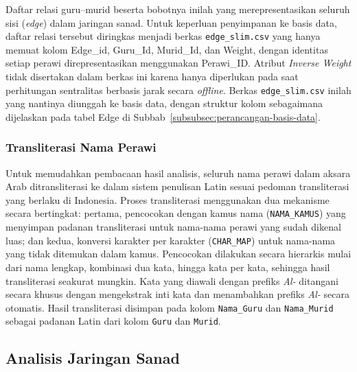 Daftar relasi guru--murid beserta bobotnya inilah yang merepresentasikan seluruh sisi (\textit{edge}) dalam jaringan sanad. Untuk keperluan penyimpanan ke basis data, daftar relasi tersebut diringkas menjadi berkas \texttt{edge\_slim.csv} yang hanya memuat kolom Edge\_id, Guru\_Id, Murid\_Id, dan Weight, dengan identitas setiap perawi direpresentasikan menggunakan Perawi\_ID. Atribut \textit{Inverse Weight} tidak disertakan dalam berkas ini karena hanya diperlukan pada saat perhitungan sentralitas berbasis jarak secara \textit{offline}. Berkas \texttt{edge\_slim.csv} inilah yang nantinya diunggah ke basis data, dengan struktur kolom sebagaimana dijelaskan pada tabel Edge di Subbab~\ref{subsubsec:perancangan-basis-data}.

\subsubsection{Transliterasi Nama Perawi}
\label{subsubsec:transliterasi}
Untuk memudahkan pembacaan hasil analisis, seluruh nama perawi dalam aksara Arab ditransliterasi ke dalam sistem penulisan Latin sesuai pedoman transliterasi yang berlaku di Indonesia. Proses transliterasi menggunakan dua mekanisme secara bertingkat: pertama, pencocokan dengan kamus nama (\texttt{NAMA\_KAMUS}) yang menyimpan padanan transliterasi untuk nama-nama perawi yang sudah dikenal luas; dan kedua, konversi karakter per karakter (\texttt{CHAR\_MAP}) untuk nama-nama yang tidak ditemukan dalam kamus. Pencocokan dilakukan secara hierarkis mulai dari nama lengkap, kombinasi dua kata, hingga kata per kata, sehingga hasil transliterasi seakurat mungkin. Kata yang diawali dengan prefiks \textit{Al-} ditangani secara khusus dengan mengekstrak inti kata dan menambahkan prefiks \textit{Al-} secara otomatis. Hasil transliterasi disimpan pada kolom \texttt{Nama\_Guru} dan \texttt{Nama\_Murid} sebagai padanan Latin dari kolom \texttt{Guru} dan \texttt{Murid}.


\subsection{Analisis Jaringan Sanad}
\label{subsec:analisis-jaringan}
